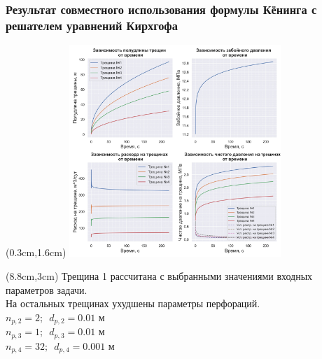 \documentclass{beamer}
\begin{document}
\begin{frame}
\frametitle{Результат совместного использования формулы Кёнинга с решателем уравнений Кирхгофа}

\begin{textblock*}{8cm}(0.3cm,1.6cm)
\includegraphics[width=8cm]{experiment_example1_300dpi.jpg}
\end{textblock*}

\begin{textblock*}{4cm}(8.8cm,3cm)
\footnotesize
Трещина 1 рассчитана с выбранными значениями входных параметров задачи.\\

На остальных трещинах ухудшены параметры перфораций.\\

$n_{p,2}=2;\,\,\,d_{p,2}=0.01\text{ м}$\\

$n_{p,3}=1;\,\,\,d_{p,3}=0.01\text{ м}$\\

$n_{p,4}=32;\,\,\,d_{p,4}=0.001\text{ м}$\\

\normalsize
\end{textblock*}

\end{frame}
\end{document}
